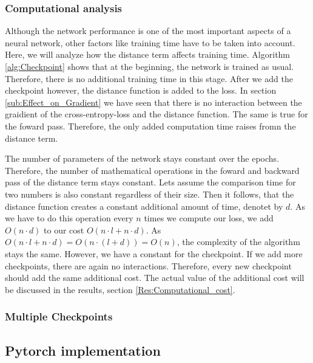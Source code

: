 \subsubsection{Computational analysis}\label{sub:Computational_Analysis}
Although the network performance is one of the most important aspects of a
neural network, other factors like training time have to be taken into account.
Here, we will analyze how the distance term affects training time. Algorithm
\ref{alg:Checkpoint} shows that at the beginning, the network is trained as
usual. Therefore, there is no additional training time in this stage. After we
add the checkpoint however, the distance function is added to the loss. In
section \ref{sub:Effect_on_Gradient} we have seen that there is no interaction
between the graidient of the cross-entropy-loss and the distance function. The
same is true for the foward pass. Therefore, the only added computation time
raises fromn the distance term.

The number of parameters of the network stays constant over the epochs.
Therefore, the number of mathematical operations in the foward and backward pass
of the distance term stays constant. Lets assume the comparison time for two
numbers is also constant regardless of their size. Then it follows, that the
distance function creates a constant additional amount of time, denotet by $d$.
As we have to do this operation every $n$ times we compute our loss, we add
$O(n\cdot d)$ to our cost $O(n\cdot l + n \cdot d)$. As $O(n\cdot l + n \cdot
d)=O(n\cdot (l + d))=O(n)$, the complexity of the algorithm stays the same.
However, we have a constant for the checkpoint. If we add more checkpoints,
there are again no interactions. Therefore, every new checkpoint should add the
same additional cost. The actual value of the additional cost will be discussed
in the results, section \ref{Res:Computational_cost}.





\subsubsection{Multiple Checkpoints}\label{sub:Multiple_checkpoints}

\subsection{Pytorch implementation}

